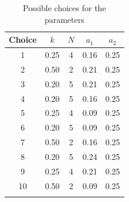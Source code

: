 \documentclass
[justified,nohyper]
{tufte-handout}
\begin{document}
\begin{fullwidth}
\begin{table}
\begin{tabular}{ccccc}
\toprule
Choice & $k$ & $N$ & $a_1$ & $a_2$ \\
\midrule
1 & 0.25 & 4 & 0.16 & 0.25 \\
2 & 0.50 & 2 & 0.21 & 0.25 \\
3 & 0.20 & 5 & 0.21 & 0.25 \\
4 & 0.20 & 5 & 0.16 & 0.25 \\
5 & 0.25 & 4 & 0.09 & 0.25 \\
6 & 0.20 & 5 & 0.09 & 0.25 \\
7 & 0.50 & 2 & 0.16 & 0.25 \\
8 & 0.20 & 5 & 0.24 & 0.25 \\
9 & 0.25 & 4 & 0.21 & 0.25 \\
10 & 0.50 & 2 & 0.09 & 0.25 \\
\bottomrule
\caption{\label{param1} Possible choices for the parameters}
\end{tabular}
\end{table}
\end{fullwidth}
\end{document}
